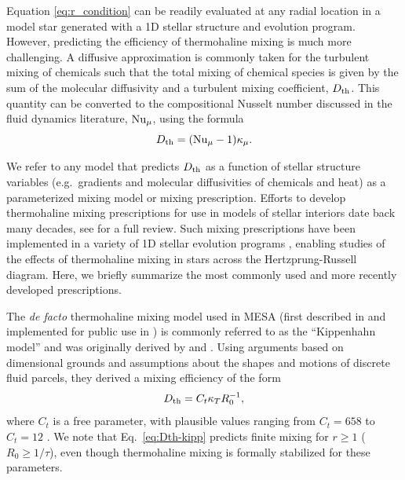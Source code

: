 %
Equation \eqref{eq:r_condition} 
can be readily evaluated at any radial location in a model star generated with a 1D stellar structure and evolution program. However, predicting the efficiency of thermohaline mixing is much more challenging. A diffusive approximation is commonly taken for the turbulent mixing of chemicals such that the total mixing of chemical species is given by the sum of the molecular diffusivity and a turbulent mixing coefficient, $D_\mathrm{th}$. This quantity can be converted to the compositional Nusselt number discussed in the fluid dynamics literature, $\mathrm{Nu}_\mu$, using the formula
\begin{equation} \label{eq:Dth_from_Nu}
    \Dth = (\Numu - 1)\kappa_\mu.
\end{equation}

We refer to any model that predicts $D_\mathrm{th}$ as a function of stellar structure variables (e.g.~gradients and molecular diffusivities of chemicals and heat) as a parameterized mixing model or mixing prescription. 
Efforts to develop thermohaline mixing prescriptions for use in models of stellar interiors date back many decades, see \citet{garaud_DDC_review_2018} for a full review. 
Such mixing prescriptions have been implemented in a variety of 1D stellar evolution programs \citep[see][and references therein]{lattanzio_etal_2015}, enabling studies of the effects of thermohaline mixing in stars across the Hertzprung-Russell diagram. %
Here, we briefly summarize the most commonly used and more recently developed prescriptions.


The \textit{de facto} thermohaline mixing model used in MESA (first described in \citealt{CantielloLanger2010} and implemented for public use in \citealt{mesa2}) is commonly referred to as the ``Kippenhahn model'' and was originally derived by \citet{Ulrich1972} and \citet{kippenhahn_etal_1980}.
Using arguments based on dimensional grounds and assumptions about the shapes and motions of discrete fluid parcels, they derived a mixing efficiency of the form
\begin{equation} \label{eq:Dth-kipp}
    \Dth = C_t \kappa_T R_0^{-1},
\end{equation}
\citep[see Eq.~(5) of][]{charbonnel_thermohaline_2007}
where $C_t$ is a free parameter, with plausible values ranging from $C_t = 658$ \citep{Ulrich1972} to $C_t = 12$ \citep{kippenhahn_etal_1980}. 
We note that Eq.~\eqref{eq:Dth-kipp} predicts finite mixing for $r \geq 1$ ($R_0 \geq 1/\tau$), even though thermohaline mixing is formally stabilized for these parameters.

